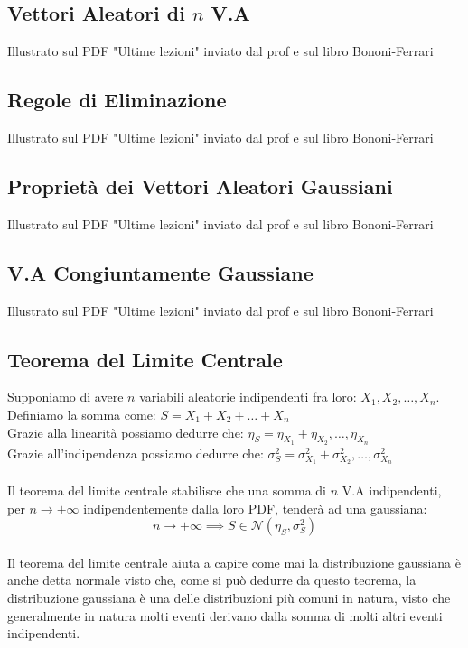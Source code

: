 \documentclass{article}
\begin{document}
\subsection{Vettori Aleatori di $n$ V.A}
Illustrato sul PDF "Ultime lezioni" inviato dal prof e sul libro Bononi-Ferrari

\subsection{Regole di Eliminazione}
Illustrato sul PDF "Ultime lezioni" inviato dal prof e sul libro Bononi-Ferrari

\subsection{Proprietà dei Vettori Aleatori Gaussiani}
Illustrato sul PDF "Ultime lezioni" inviato dal prof e sul libro Bononi-Ferrari

\subsection{V.A Congiuntamente Gaussiane}
Illustrato sul PDF "Ultime lezioni" inviato dal prof e sul libro Bononi-Ferrari

\subsection{Teorema del Limite Centrale}
Supponiamo di avere $n$ variabili aleatorie indipendenti fra loro: $X_1, X_2, \dots, X_n$. \\
Definiamo la somma come: $S = X_1 + X_2+  \dots + X_n$ \\
Grazie alla linearità possiamo dedurre che: $\eta_S = \eta_{X_1} + \eta_{X_2}, \dots, \eta_{X_n}$ \\
Grazie all'indipendenza possiamo dedurre che: $\sigma_S^2 = \sigma_{X_1}^2 + \sigma_{X_2}^2, \dots, \sigma_{X_n}^2$ \\ \\
Il teorema del limite centrale stabilisce che una somma di $n$ V.A indipendenti, per $n \to +\infty$ indipendentemente dalla loro PDF, tenderà ad una gaussiana: 
\[n \to +\infty \implies S \in \mathcal{N}\left( \eta_S, \sigma_S^2 \right)\]
\\ Il teorema del limite centrale aiuta a capire come mai la distribuzione gaussiana è anche detta normale visto che, come si può dedurre da questo teorema, la distribuzione gaussiana è una delle distribuzioni più comuni in natura, visto che generalmente in natura molti eventi derivano dalla somma di molti altri eventi indipendenti.
\end{document}

